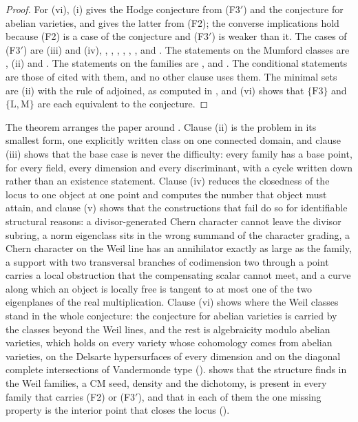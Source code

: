 \begin{proof}
For (vi), (i) gives the Hodge conjecture from
\textup{(F3$'$)} and the conjecture for abelian varieties, and
 gives the latter from \textup{(F2)}; the converse
implications hold because \textup{(F2)} is a case of the conjecture and
\textup{(F3$'$)} is weaker than it. The cases of \textup{(F3$'$)} are
(iii) and (iv), ,
, ,
, ,
,  and .
The statements on
the Mumford classes are , (ii) and
. The statements on the families are
,  and . The
conditional statements are those of  cited with them,
and no other clause uses them. The
minimal sets are (ii) with
the rule of  adjoined, as computed in ,
and (vi) shows that $\{\mathrm{F3}\}$ and
$\{\mathrm{L},\mathrm{M}\}$ are each equivalent to the conjecture.
\end{proof}

The theorem arranges the paper around . Clause (ii) is the
problem in its smallest form, one explicitly written class on one connected
domain, and clause (iii) shows that the base case is never the difficulty:
every family has a base point, for every field, every dimension and every
discriminant, with a cycle written down rather than an existence statement.
Clause (iv) reduces the closedness of the locus to one object at one point
and computes the number that object must attain, and clause (v) shows that
the constructions that fail do so for identifiable structural reasons: a
divisor-generated Chern character cannot leave the divisor subring, a norm
eigenclass sits in the wrong summand of the character grading, a Chern
character on the Weil line has an annihilator exactly as large as the family,
a support with two transversal branches of codimension two through a point
carries a local obstruction that the compensating scalar cannot meet, and a curve along which an object is locally
free is tangent to at most one of the two eigenplanes of the real
multiplication. Clause (vi) shows where the Weil classes stand in the whole
conjecture: the conjecture for abelian varieties is carried by the classes
beyond the Weil lines, and the rest is algebraicity modulo abelian varieties,
which holds on every variety whose cohomology comes from abelian varieties,
on the Delsarte hypersurfaces of every dimension and on the diagonal
complete intersections of Vandermonde type ().
 shows that the structure  finds in the
Weil families, a CM seed, density and the dichotomy, is present in every
family that carries (F2) or \textup{(F3$'$)}, and that in each of them the
one missing property is the interior point that closes the locus
().

